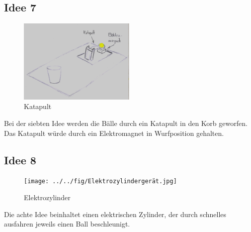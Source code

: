 \subsection{Idee 7}
\begin{figure}[h!]
	\centering
	\includegraphics[width=0.5\textwidth]{../../fig/EM-Katapult.jpg}
	\caption{Katapult}
	\label{fig:katapult}
\end{figure}
Bei der siebten Idee werden die Bälle durch ein Katapult in den Korb geworfen. Das Katapult würde durch ein Elektromagnet in Wurfposition gehalten.

\subsection{Idee 8}
\begin{figure}[h!]
	\centering
	\texttt{[image: ../../fig/Elektrozylindergerät.jpg]}
	\caption{Elektrozylinder}
	\label{fig:elektrozylinder}
\end{figure}
Die achte Idee beinhaltet einen elektrischen Zylinder, der durch schnelles ausfahren jeweils einen Ball beschleunigt.
